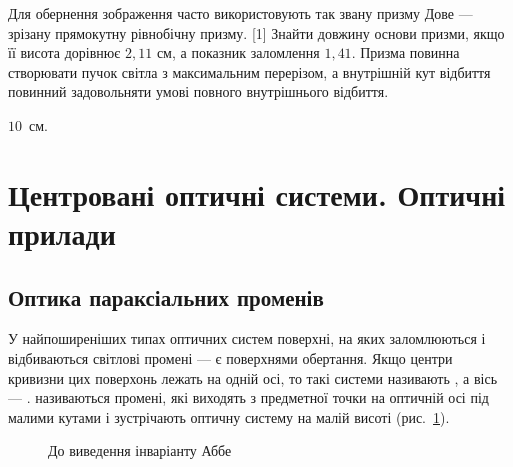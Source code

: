 \begin{problem}
Для обернення зображення часто використовують так
звану призму Дове --- зрізану прямокутну рівнобічну
призму.
[1]
Знайти довжину основи призми, якщо її висота
дорівнює $2,11$ см, а показник заломлення $1,41$. Призма повинна
створювати пучок світла з максимальним перерізом, а внутрішній кут
відбиття повинний задовольняти умові повного внутрішнього відбиття.

\begin{solution}
	$10$~см.
\end{solution}
\end{problem}


\section{Центровані оптичні системи. Оптичні прилади}




\subsection{Оптика параксіальних променів}


У найпоширеніших типах оптичних систем поверхні, на яких заломлюються і відбиваються світлові промені --- є поверхнями обертання. Якщо центри кривизни цих поверхонь лежать на одній осі, то такі системи називають , а вісь --- .  називаються промені, які виходять з предметної точки на оптичній осі під малими кутами і зустрічають оптичну систему на малій висоті (рис.~\ref{pic:Abbe_Inv}).

\begin{figure}[h!]\centering
	
	\caption{До виведення інваріанту Аббе}
	\label{pic:Abbe_Inv}
\end{figure}







